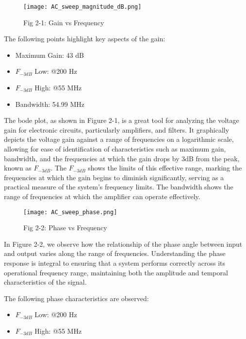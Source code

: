 \documentclass[conference]{IEEEtran}
\begin{document}
\begin{figure}[htbp]
    \centering
    \texttt{[image: AC\_sweep\_magnitude\_dB.png]}
    \caption{Fig 2-1: Gain vs Frequency}
    \label{fig:fig-2-1-gain-frequency}
\end{figure}

The following points highlight key aspects of the gain:
\begin{itemize}
    \item Maximum Gain: 43 dB
    \item \( F_{-3dB} \) Low: @200 Hz
    \item \( F_{-3dB} \) High: @55 MHz
    \item Bandwidth: 54.99 MHz
\end{itemize}
\par
\vspace{12pt} %

The bode plot, as shown in Figure 2-1, is a great tool for analyzing the voltage gain for electronic circuits, particularly amplifiers, and filters. It graphically depicts the voltage gain against a range of frequencies on a logarithmic scale, allowing for ease of identification of characteristics such as maximum gain, bandwidth, and the frequencies at which the gain drops by 3dB from the peak, known as \( F_{-3dB} \). The \( F_{-3dB} \) shows the limits of this effective range, marking the frequencies at which the gain begins to diminish significantly, serving as a practical measure of the system's frequency limits. The bandwidth shows the range of frequencies at which the amplifier can operate effectively.

\begin{figure}[htbp]
    \centering
    \texttt{[image: AC\_sweep\_phase.png]}
    \caption{Fig 2-2: Phase vs Frequency}
    \label{fig:fig-2-2-phase-frequency}
\end{figure}

In Figure 2-2, we observe how the relationship of the phase angle between input and output varies along the range of frequencies. Understanding the phase response is integral to ensuring that a system performs correctly across its operational frequency range, maintaining both the amplitude and temporal characteristics of the signal.

The following phase characteristics are observed:
\begin{itemize}
    \item \( F_{-3dB} \) Low: @200 Hz
    \item \( F_{-3dB} \) High: @55 MHz
\end{itemize}
\par
\vspace{12pt} %
\end{document}
